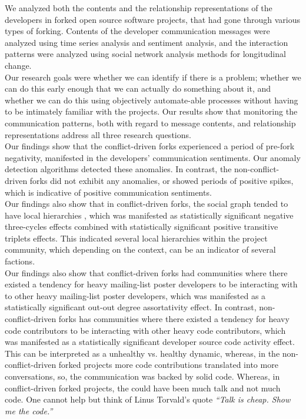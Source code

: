 \documentclass[12pt,letterpaper]{gthesis2}  %
\begin{document}
We analyzed both the contents and the relationship representations of the developers in forked open source software projects, that had gone through various types of forking. Contents of the developer communication messages were analyzed using time series analysis and sentiment analysis, and the interaction patterns were analyzed using social network analysis methods for longitudinal change. \\

Our research goals were whether we can identify if there is a problem; whether we can do this early enough that we can actually do something about it, and whether we can do this using objectively automate-able processes without having to be intimately familiar with the projects. Our results show that monitoring the communication patterns, both with regard to message contents, and relationship representations address all three research questions. \\

Our findings show that the conflict-driven forks experienced a period of pre-fork negativity, manifested in the developers' communication sentiments. Our anomaly detection algorithms detected these anomalies. In contrast, the non-conflict-driven forks did not exhibit any anomalies, or showed periods of positive spikes, which is indicative of positive communication sentiments. \\

Our findings also show that in conflict-driven forks, the social graph tended to have local hierarchies \cite{Snijders2010}, which was manifested as statistically significant negative three-cycles effects combined with statistically significant positive transitive triplets effects. This indicated several local hierarchies within the project community, which depending on the context, can be an indicator of several factions. \\ 

Our findings also show that conflict-driven forks had communities where there existed a tendency for heavy mailing-list poster developers to be interacting with to other heavy mailing-list poster developers, which was manifested as a statistically significant out-out degree assortativity effect. In contrast, non-conflict-driven forks has communities where there existed a tendency for heavy code contributors to be interacting with other heavy code contributors, which was manifested as a statistically significant developer source code activity effect. This can be interpreted as a unhealthy vs. healthy dynamic, whereas, in the non-conflict-driven forked projects more code contributions translated into more conversations, so, the communication was backed by solid code. Whereas, in conflict-driven forked projects, the could have been much talk and not much code. One cannot help but think of Linus Torvald's quote \textit{``Talk is cheap. Show me the code.''}\\
\end{document}
